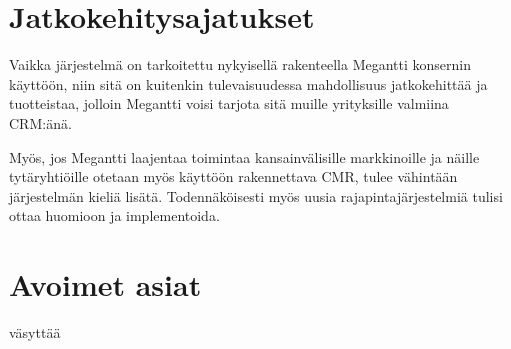 \section{Jatkokehitysajatukset}     %

    Vaikka järjestelmä on tarkoitettu nykyisellä rakenteella Megantti konsernin käyttöön, niin sitä on kuitenkin tulevaisuudessa
    mahdollisuus jatkokehittää ja tuotteistaa, jolloin Megantti voisi tarjota sitä muille yrityksille valmiina CRM:änä.

    Myös, jos Megantti laajentaa toimintaa kansainvälisille markkinoille ja näille tytäryhtiöille otetaan myös käyttöön rakennettava
    CMR, tulee vähintään järjestelmän kieliä lisätä. Todennäköisesti myös uusia rajapintajärjestelmiä tulisi ottaa huomioon ja implementoida.

\section{Avoimet asiat}     %

    väsyttää



   
